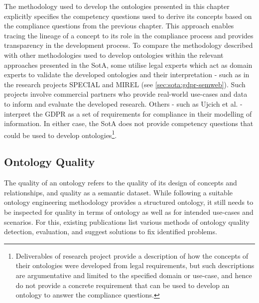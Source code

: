 The methodology used to develop the ontologies presented in this chapter explicitly specifies the competency questions used to derive its concepts based on the compliance questions from the previous chapter. This approach enables tracing the lineage of a concept to its role in the compliance process and provides transparency in the development process.
To compare the methodology described with other methodologies used to develop ontologies within the relevant approaches presented in the SotA, some utilise legal experts which act as domain experts to validate the developed ontologies and their interpretation - such as in the research projects SPECIAL and MIREL (see \autoref{sec:sota:gdpr-semweb}). Such projects involve commercial partners who provide real-world use-cases and data to inform and evaluate the developed research.
Others - such as Ujcich et al. \cite{belhajjame_provenance_2018} - interpret the GDPR as a set of requirements for compliance in their modelling of information. In either case, the SotA does not provide competency questions that could be used to develop ontologies\footnote{Deliverables of research project provide a description of how the concepts of their ontologies were developed from legal requirements, but such descriptions are argumentative and limited to the specified domain or use-case, and hence do not provide a concrete requirement that can be used to develop an ontology to answer the compliance questions.}.


\subsection{Ontology Quality}
The quality of an ontology refers to the quality of its design of concepts and relationships, and quality as a semantic dataset. While following a suitable ontology engineering methodology provides a structured ontology, it still needs to be inspected for quality in terms of ontology as well as for intended use-cases and scenarios. For this, existing publications \cite{gurk_towards_2017,vrandecic_ontology_2010} list various methods of ontology quality detection, evaluation, and suggest solutions to fix identified problems.

